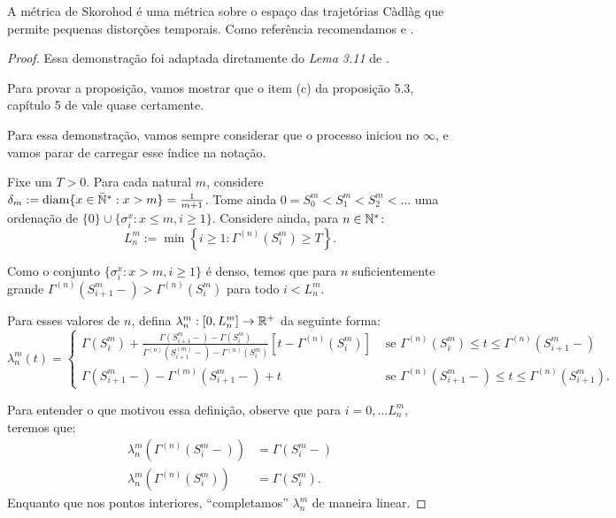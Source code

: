 A métrica de Skorohod é uma métrica sobre o espaço das trajetórias
Càdlàg que permite pequenas distorções temporais. Como
referência recomendamos \cite{billingsley:99} e \cite{ethier:86}.


\begin{proof}
  Essa demonstração foi adaptada diretamente do \emph{Lema 3.11} de
  \cite{fontes:08}.

  Para provar a proposição, vamos mostrar que o item (c) da proposição
  5.3, capítulo 5 de \cite{ethier:86} vale quase certamente.

  Para essa demonstração, vamos sempre considerar que o processo
  iniciou no $\infty$, e vamos parar de carregar esse índice na notação.

  Fixe um $T > 0$. Para cada natural $m$, considere $\delta_m :=
  {\mathrm{diam}}\{ x \in {\mathbb{\bar{N}^*}}: x > m \} = \frac{1}{m+1}$. Tome ainda $0 = S_0^m
  < S_1^m < S_2^m < \ldots $ uma ordenação de $\{0\}\cup\{ \sigma^x_i
  : x \leq m, i \geq 1\}$. Considere ainda, para $n \in {\mathbb{N^*}}$:
  \begin{displaymath}
    L^m_n := \min \left\{ i \geq 1: \Gamma^{(n)}(S^m_i) \geq T \right\}.
  \end{displaymath}

  Como o conjunto $\{\sigma_i^x: x > m, i\geq 1\}$ é denso, temos
  que para $n$ suficientemente grande $\Gamma^{(n)}(S^m_{i+1}-) >
  \Gamma^{(n)}(S^m_i)$ para todo $i < L^m_n$.

  Para esses valores de $n$, defina $\lambda_n^m: [0, L_n^m] \to {\mathbb{R}}^+$
  da seguinte forma:
  \begin{displaymath}
    \lambda_n^m(t) = \begin{cases}
      \Gamma(S_i^m) + \frac{\Gamma(S_{i+1}^m-) - \Gamma(S_i^m)}
      {\Gamma^{(n)}(S_{i+1}^{(m)} -) - \Gamma^{(n)}(S_i^m)}
      \left[t - \Gamma^{(n)}(S_i^m)\right]
      & \textrm{ se }
      \Gamma^{(n)}(S_i^m) \leq t \leq \Gamma^{(n)}(S_{i+1}^m-) \\
      \Gamma(S_{i+1}^m-) - \Gamma^{(m)}(S_{i+1}^m-) + t
      & \textrm{ se }
      \Gamma^{(n)}(S_{i+1}^m-) \leq t \leq \Gamma^{(n)}(S_{i+1}^m).
    \end{cases}
  \end{displaymath}

  Para entender o que motivou essa definição, observe que para $i = 0,
  \ldots L_n^m$, teremos que:
  \begin{align*}
    \lambda_n^m(\Gamma^{(n)}(S_i^m-)) &= \Gamma(S_i^m-)\\
    \lambda_n^m(\Gamma^{(n)}(S_i^m)) &= \Gamma(S_i^m).
  \end{align*}
  Enquanto que nos pontos interiores, ``completamos'' $\lambda_n^m$ de
  maneira linear.


\end{proof}
